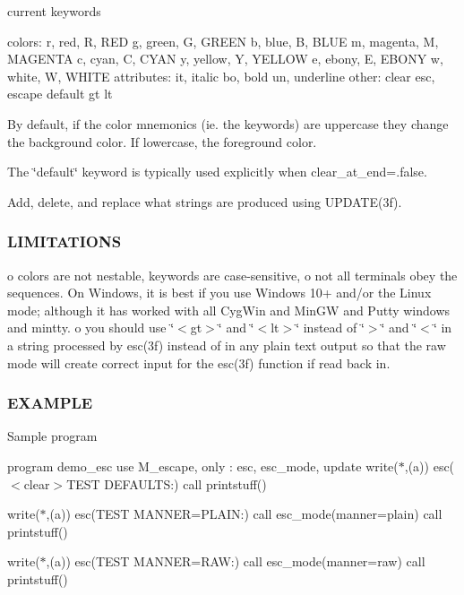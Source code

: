 current keywords

colors\+: r, red, R, R\+ED g, green, G, G\+R\+E\+EN b, blue, B, B\+L\+UE m, magenta, M, M\+A\+G\+E\+N\+TA c, cyan, C, C\+Y\+AN y, yellow, Y, Y\+E\+L\+L\+OW e, ebony, E, E\+B\+O\+NY w, white, W, W\+H\+I\+TE attributes\+: it, italic bo, bold un, underline other\+: clear esc, escape default gt lt

By default, if the color mnemonics (ie. the keywords) are uppercase they change the background color. If lowercase, the foreground color.

The \char`\"{}default\char`\"{} keyword is typically used explicitly when clear\+\_\+at\+\_\+end=.false.

Add, delete, and replace what strings are produced using U\+P\+D\+A\+T\+E(3f).

\subsubsection*{L\+I\+M\+I\+T\+A\+T\+I\+O\+NS}

o colors are not nestable, keywords are case-\/sensitive, o not all terminals obey the sequences. On Windows, it is best if you use Windows 10+ and/or the Linux mode; although it has worked with all Cyg\+Win and Min\+GW and Putty windows and mintty. o you should use \char`\"{}$<$gt$>$\char`\"{} and \char`\"{}$<$lt$>$\char`\"{} instead of \char`\"{}$>$\char`\"{} and \char`\"{}$<$\char`\"{} in a string processed by esc(3f) instead of in any plain text output so that the raw mode will create correct input for the esc(3f) function if read back in.

\subsubsection*{E\+X\+A\+M\+P\+LE}

Sample program

program demo\+\_\+esc use M\+\_\+escape, only \+: esc, esc\+\_\+mode, update write($\ast$,\textquotesingle{}(a)\textquotesingle{}) esc(\textquotesingle{}$<$clear$>$T\+E\+ST D\+E\+F\+A\+U\+L\+TS\+:\textquotesingle{}) call printstuff()

write($\ast$,\textquotesingle{}(a)\textquotesingle{}) esc(\textquotesingle{}T\+E\+ST M\+A\+N\+N\+ER=P\+L\+A\+IN\+:\textquotesingle{}) call esc\+\_\+mode(manner=\textquotesingle{}plain\textquotesingle{}) call printstuff()

write($\ast$,\textquotesingle{}(a)\textquotesingle{}) esc(\textquotesingle{}T\+E\+ST M\+A\+N\+N\+ER=R\+AW\+:\textquotesingle{}) call esc\+\_\+mode(manner=\textquotesingle{}raw\textquotesingle{}) call printstuff()

